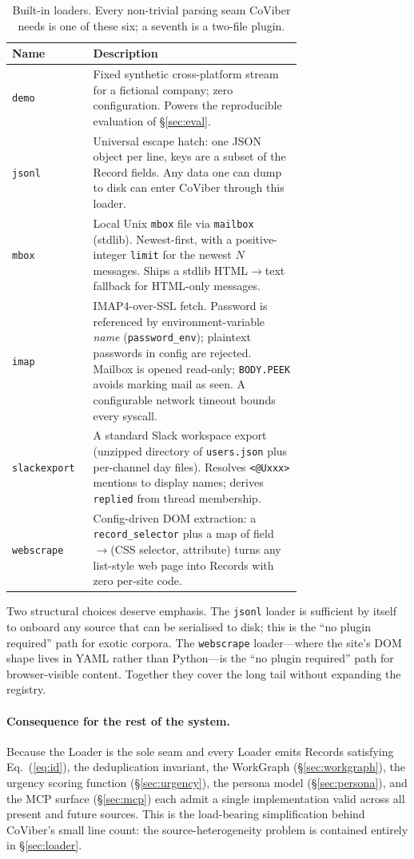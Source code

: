 \begin{table}[h]
\centering
\small
\begin{tabular}{@{}lp{0.72\linewidth}@{}}
\toprule
Name & Description \\
\midrule
\texttt{demo}        & Fixed synthetic cross-platform stream for a fictional company; zero configuration. Powers the reproducible evaluation of \S\ref{sec:eval}. \\
\texttt{jsonl}       & Universal escape hatch: one JSON object per line, keys are a subset of the Record fields. Any data one can dump to disk can enter CoViber through this loader. \\
\texttt{mbox}        & Local Unix \texttt{mbox} file via \texttt{mailbox} (stdlib). Newest-first, with a positive-integer \texttt{limit} for the newest $N$ messages. Ships a stdlib HTML$\rightarrow$text fallback for HTML-only messages. \\
\texttt{imap}        & IMAP4-over-SSL fetch. Password is referenced by environment-variable \emph{name} (\texttt{password\_env}); plaintext passwords in config are rejected. Mailbox is opened read-only; \texttt{BODY.PEEK} avoids marking mail as seen. A configurable network timeout bounds every syscall. \\
\texttt{slackexport} & A standard Slack workspace export (unzipped directory of \texttt{users.json} plus per-channel day files). Resolves \texttt{<@Uxxx>} mentions to display names; derives \texttt{replied} from thread membership. \\
\texttt{webscrape}   & Config-driven DOM extraction: a \texttt{record\_selector} plus a map of field$\rightarrow$(CSS selector, attribute) turns any list-style web page into Records with zero per-site code. \\
\bottomrule
\end{tabular}
\caption{Built-in loaders. Every non-trivial parsing seam CoViber needs is one of these six; a seventh is a two-file plugin.}
\label{tab:builtin-loaders}
\end{table}

Two structural choices deserve emphasis. The \texttt{jsonl} loader is
sufficient by itself to onboard any source that can be serialised to disk;
this is the ``no plugin required'' path for exotic corpora. The
\texttt{webscrape} loader---where the site's DOM shape lives in YAML rather
than Python---is the ``no plugin required'' path for browser-visible content.
Together they cover the long tail without expanding the registry.

\paragraph{Consequence for the rest of the system.}
Because the Loader is the sole seam and every Loader emits Records satisfying
Eq.~(\ref{eq:id}), the deduplication invariant, the WorkGraph
(\S\ref{sec:workgraph}), the urgency scoring function
(\S\ref{sec:urgency}), the persona model (\S\ref{sec:persona}), and the
MCP surface (\S\ref{sec:mcp}) each admit a single implementation valid
across all present and future sources. This is the load-bearing simplification
behind CoViber's small line count: the source-heterogeneity problem is
contained entirely in \S\ref{sec:loader}.
